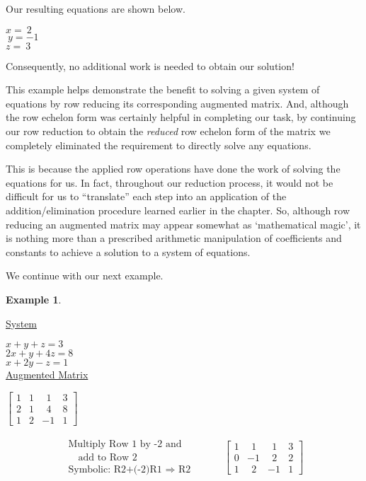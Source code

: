 \documentclass[12pt]{book}
\theoremstyle{definition}
\newtheorem{example}{Example}
\begin{document}
Our resulting equations are shown below.
\begin{center}
$x=~2$\\
$~y=-1$\\
$z=~3$
\end{center}
Consequently, no additional work is needed to obtain our solution!\par
This example helps demonstrate the benefit to solving a given system of equations by row reducing its corresponding augmented matrix.  And, although the row echelon form was certainly helpful in completing our task, by continuing our row reduction to obtain the \textit{reduced} row echelon form of the matrix we completely eliminated the requirement to directly solve any equations.\par
This is because the applied row operations have done the work of solving the equations for us.  In fact, throughout our reduction process, it would not be difficult for us to ``translate'' each step into an application of the addition/elimination procedure learned earlier in the chapter.  So, although row reducing an augmented matrix may appear somewhat as `mathematical magic', it is nothing more than a prescribed arithmetic manipulation of coefficients and constants to achieve a solution to a system of equations.\par
We continue with our next example.
\begin{example}
\end{example}
\begin{center}
\begin{multicols}{2}
\underline{System}\par
$x+y+z=3$\\
$2x+y+4z=8$\\
$x+2y-z=1$\\
\underline{Augmented Matrix}\par
$\left[\begin{array}{ccc|c}
1 & 1 & ~~1 & 3\\
2 & 1 & ~~4 & 8\\
1 & 2 & -1 & 1
\end{array}\right]$
\end{multicols}
\end{center}
\begin{eqnarray*}
\begin{array}{l}
\text{Multiply Row 1 by -2 and}\\
\text{~~~add to Row 2}\\
\text{Symbolic: R2+(-2)R1~}\Rightarrow \text{~R2}
\end{array}
&&
~~~~~~\left[
\begin{array}{ccc|c}
1 & ~~1 & ~~1 & 3\\
0 & -1 & ~~2 & 2\\
1 & ~~2 & -1 & 1
\end{array}
\right]
\end{eqnarray*}
\end{document}
